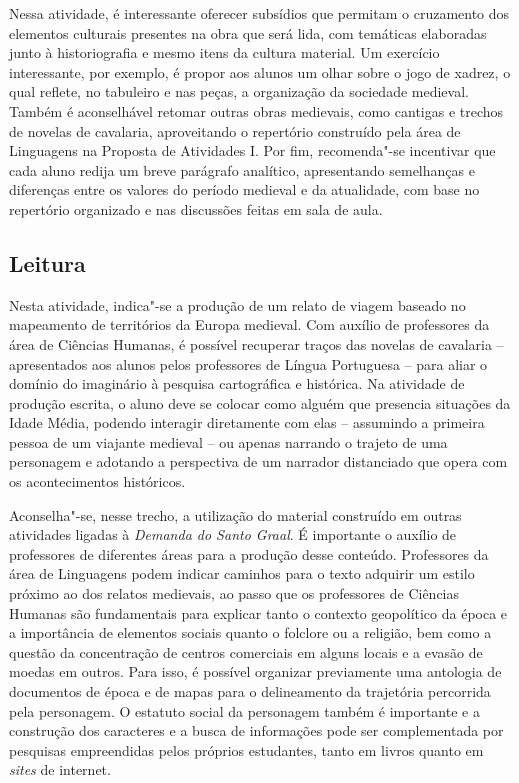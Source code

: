 \documentclass[11pt]{extarticle}
\begin{document}
Nessa atividade, é interessante oferecer subsídios que permitam o
cruzamento dos elementos culturais presentes na obra que será lida, com
temáticas elaboradas junto à historiografia e mesmo itens da cultura
material. Um exercício interessante, por exemplo, é propor aos alunos um
olhar sobre o jogo de xadrez, o qual reflete, no tabuleiro e nas peças,
a organização da sociedade medieval. Também é aconselhável retomar
outras obras medievais, como cantigas e trechos de novelas de cavalaria,
aproveitando o repertório construído pela área de Linguagens na Proposta
de Atividades I. Por fim, recomenda"-se incentivar que cada aluno redija
um breve parágrafo analítico, apresentando semelhanças e diferenças
entre os valores do período medieval e da atualidade, com base no
repertório organizado e nas discussões feitas em sala de aula.

\subsection{Leitura}

Nesta atividade, indica"-se a produção de um relato de viagem
baseado no mapeamento de territórios da Europa medieval. Com auxílio de
professores da área de Ciências Humanas, é possível recuperar traços das
novelas de cavalaria -- apresentados aos alunos pelos professores de
Língua Portuguesa -- para aliar o domínio do imaginário à pesquisa
cartográfica e histórica. Na atividade de produção escrita, o aluno deve
se colocar como alguém que presencia situações da Idade Média, podendo
interagir diretamente com elas -- assumindo a primeira pessoa de um
viajante medieval -- ou apenas narrando o trajeto de uma personagem e
adotando a perspectiva de um narrador distanciado que opera com os
acontecimentos históricos.

Aconselha"-se, nesse trecho, a utilização do material construído em
outras atividades ligadas à \emph{Demanda do Santo Graal}. É importante
o auxílio de professores de diferentes áreas para a produção desse
conteúdo. Professores da área de Linguagens podem indicar caminhos para
o texto adquirir um estilo próximo ao dos relatos medievais, ao passo
que os professores de Ciências Humanas são fundamentais para explicar
tanto o contexto geopolítico da época e a importância de elementos
sociais quanto o folclore ou a religião, bem como a questão da
concentração de centros comerciais em alguns locais e a evasão de moedas
em outros. Para isso, é possível organizar previamente uma antologia de
documentos de época e de mapas para o delineamento da trajetória
percorrida pela personagem. O estatuto social da personagem também é
importante e a construção dos caracteres e a busca de informações pode
ser complementada por pesquisas empreendidas pelos próprios estudantes,
tanto em livros quanto em \emph{sites} de internet.
\end{document}
